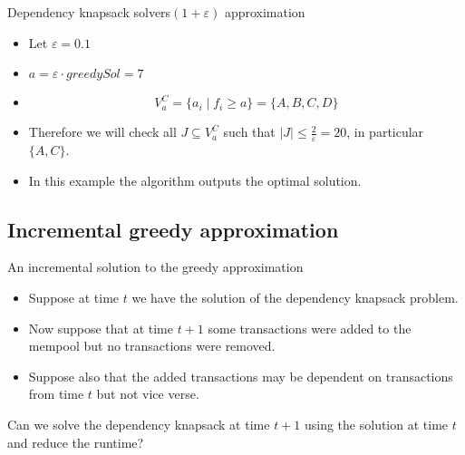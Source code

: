 \documentclass{beamer}
\begin{document}
\begin{frame}{Dependency knapsack solvers}{$(1+\varepsilon)$ approximation} 
    \begin{example}
        \begin{itemize}
            \item {Let $\varepsilon = 0.1$}
            \item {$ a = \varepsilon \cdot greedySol = 7$}
            \item {$$V_a^C = \{a_i \mid f_i \geq a \} = \{A,B,C,D\}$$}
            \item {Therefore we will check all $J \subseteq V_a^C$ such 
            that $|J| \leq \frac{2}{\varepsilon} = 20$, in particular 
            $\{A,C\}$.}
            \item {In this example the algorithm outputs the optimal 
            solution.}
        \end{itemize}
    \end{example}
\end{frame}

\subsection*{Incremental greedy approximation}

\begin{frame}{An incremental solution to the greedy approximation} %
    \begin{itemize}
        \item {Suppose at time $t$ we have the solution of the dependency knapsack problem.}
        \item {Now suppose that at time $t+1$ some transactions were added to the
         mempool but no transactions were removed.}
        \item {Suppose also that the added transactions may be dependent on
         transactions from time $t$ but not vice verse.}
    \end{itemize}
     \begin{block}{}
        Can we solve the dependency knapsack at time $t+1$ using the
         solution at time $t$ and reduce the runtime?
        \end{block}
\end{frame}
\end{document}
